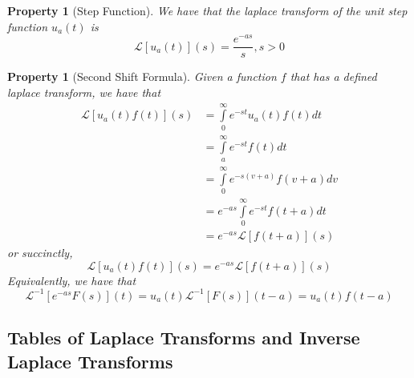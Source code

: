 \documentclass[12pt]{article}
\newtheorem{pro}[thm]{Property}
\theoremstyle{definition}
\theoremstyle{remark}
\numberwithin{equation}{section}
\begin{document}
\vspace{1cm}


\begin{pro}[Step Function]
        We have that the laplace transform of the unit step function $u_a(t)$ is \begin{equation}
                \mathcal{L}[u_a(t)](s) = \frac{e^{-as}}{s}, s > 0
        \end{equation}
\end{pro}


\vspace{1cm}

\begin{pro}[Second Shift Formula]
        Given a function $f$ that has a defined laplace transform, we have that \begin{align*}
                \mathcal{L}[u_a(t)f(t)](s) &= \int\limits_{0}^{\infty}e^{-st}u_a(t)f(t)dt \\
                &= \int\limits_{a}^{\infty}e^{-st}f(t)dt\tag{take $v = t - a$, $dv=dt$} \\
                &= \int\limits_{0}^{\infty}e^{-s(v+a)}f(v+a)dv\tag{shift $v \rightarrow t$} \\
                &= e^{-as}\int\limits_{0}^{\infty}e^{-st}f(t+a)dt \\
                &= e^{-as}\mathcal{L}[f(t+a)](s)
        \end{align*}
        or succinctly, \begin{equation}
                \mathcal{L}[u_a(t)f(t)](s) = e^{-as}\mathcal{L}[f(t+a)](s)
        \end{equation}
        Equivalently, we have that \begin{equation}
                \mathcal{L}^{-1}[e^{-as}F(s)](t) = u_a(t)\mathcal{L}^{-1}[F(s)](t-a) = u_a(t)f(t-a)
        \end{equation}
\end{pro}



\vspace{1cm}



\subsection{Tables of Laplace Transforms and Inverse Laplace Transforms}
\end{document}
